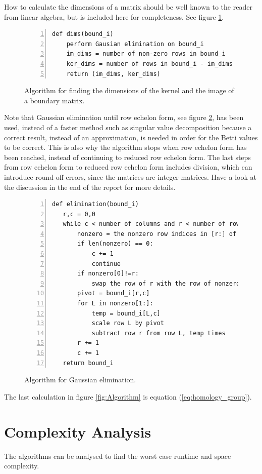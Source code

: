 \documentclass[11pt,a4paper,twoside]{report}
\begin{document}
How to calculate the dimensions of a matrix should be well known to the reader from linear algebra, but is included here for completeness. See figure \ref{fig:Algorithm_dims}.
\begin{figure}[H]
\begin{lstlisting}[numbers=left]
def dims(bound_i)
    perform Gausian elimination on bound_i
    im_dims = number of non-zero rows in bound_i
    ker_dims = number of rows in bound_i - im_dims
    return (im_dims, ker_dims)
\end{lstlisting}
\caption{Algorithm for finding the dimensions of the kernel and the image of a boundary matrix.}
\label{fig:Algorithm_dims}
\end{figure}
Note that Gaussian elimination until row echelon form, see figure \ref{fig:Algorithm_gauss}, has been used, instead of a faster method such as singular value decomposition because a correct result, instead of an approximation, is needed in order for the Betti values to be correct. This is also why the algorithm stops when row echelon form has been reached, instead of continuing to reduced row echelon form. The last steps from row echelon form to reduced row echelon form includes division, which can introduce round-off errors, since the matrices are integer matrices. Have a look at the discussion in the end of the report for more details.
\begin{figure}[H]
\begin{lstlisting}[numbers=left]
def elimination(bound_i)
   r,c = 0,0
   while c < number of columns and r < number of rows:
       nonzero = the nonzero row indices in [r:] of column c
       if len(nonzero) == 0:
           c += 1
           continue
       if nonzero[0]!=r:
           swap the row of r with the row of nonzero
       pivot = bound_i[r,c]
       for L in nonzero[1:]:
           temp = bound_i[L,c]
           scale row L by pivot
           subtract row r from row L, temp times
       r += 1
       c += 1
   return bound_i
\end{lstlisting}
\caption{Algorithm for Gaussian elimination.}
\label{fig:Algorithm_gauss}
\end{figure}
The last calculation in figure \ref{fig:Algorithm} is equation (\ref{eq:homology_group}).
\section{Complexity Analysis}
The algorithms can be analysed to find the worst case runtime and space complexity. 
\end{document}
